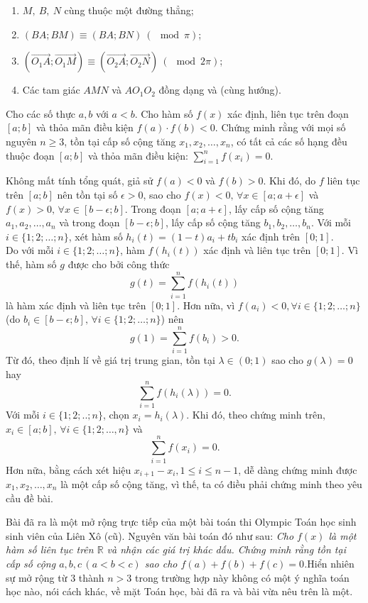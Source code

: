 \begin{bt}
{\begin{nx}
\begin{enumerate}[1.]
\begin{bode}
					\begin{enumerate}[1.]
						\item $M,~B,~N$ cùng thuộc một đường thẳng;
						\item $(BA;BM)\equiv(BA;BN)~(\mod \pi)$;
						\item $(\vec{O_1A};\vec{O_1M})\equiv(\vec{O_2A};\vec{O_2N}) ~(\mod 2 \pi)$;
						\item Các tam giác $AMN$ và $AO_1O_2$ đồng dạng và (cùng hướng).
					\end{enumerate}
				\end{bode}
			\end{enumerate}
		\end{nx}
	}
\end{bt}
\begin{bt}%
	Cho các số thực $a,b$ với $a<b$. Cho hàm số $f(x)$ xác định, liên tục trên đoạn $[a;b]$ và thỏa mãn điều kiện $f(a)\cdot f(b)<0$. Chứng minh rằng với mọi số nguyên $n\geq 3$, tồn tại cấp số cộng tăng $x_1, x_2, \dotsc, x_n$, có tất cả các số hạng đều thuộc đoạn $[a;b]$ và thỏa mãn điều kiện: $\sum \limits_{i=1}^{n}f(x_i)=0$.
	\loigiai
	{
		Không mất tính tổng quát, giả sử $f(a)<0$ và $f(b)>0$. Khi đó, do $f$ liên tục trên $[a;b]$ nên tồn tại số $\epsilon >0$, sao cho $f(x)<0, \, \forall x\in [a; a+\epsilon]$ và $f(x)>0, \, \forall x\in[b-\epsilon; b]$.		
		Trong đoạn $[a; a+\epsilon]$, lấy cấp số cộng tăng $a_1, a_2, \dotsc, a_n$ và trong đoạn $[b-\epsilon;b]$, lấy cấp số cộng tăng $b_1, b_2,\dotsc,b_n.$ Với mỗi $i\in \{1;2;\dotsc;n\}$, xét hàm số $h_i(t)=(1-t)a_i+tb_i$ xác định trên $[0;1].$\\
		Do với mỗi $i\in \{ 1;2;\dotsc;n\}$, hàm $f(h_i(t))$ xác định và liên tục trên $[0;1]$. Vì thế, hàm số $g$ được cho bởi công thức $$ g(t)=\sum \limits_{i=1}^{n}f(h_i(t))$$ là hàm xác định và liên tục trên $[0;1]$. 		
		Hơn nữa, vì $f(a_i)<0, \forall i\in \{1;2;\dotsc;n\}$ (do $b_i\in [b-\epsilon; b], \,\forall i\in \{1;2;\dotsc;n\}$) nên $$g(1)=\sum\limits_{i=1}^{n}f(b_i)>0.$$
		Từ đó, theo định lí về giá trị trung gian, tồn tại $\lambda \in (0;1)$ sao cho $g(\lambda)=0$ hay $$\sum\limits_{i=1}^{n} f(h_i(\lambda))=0.$$
		Với mỗi $i\in\{1;2;..;n\}$, chọn $x_i=h_i(\lambda)$. Khi đó, theo chứng minh trên, $x_i\in[a;b], \, \forall i\in \{ 1;2;\dotsc,n\}$ và $$\sum\limits_{i=1}^{n} f(x_i)=0.$$
		Hơn nữa, bằng cách xét hiệu $x_{i+1}-x_i, 1\leq i\leq n-1$, dễ dàng chứng minh được $x_1, x_2,\dotsc, x_n$ là một cấp số cộng tăng, vì thế, ta có điều phải chứng minh theo yêu cầu đề bài.
\begin{nx}Bài đã ra là một mở rộng trực tiếp của một bài toán thi Olympic Toán học sinh sinh viên của Liên Xô (cũ). Nguyên văn bài toán đó như sau: {\em{Cho $f(x)$ là một hàm số liên tục trên $\mathbb{R}$ và nhận các giá trị khác dấu. Chứng minh rằng tồn tại cấp số cộng $a,b,c\, (a<b<c)$ sao cho $f(a)+f(b)+f(c)=0$.}}Hiển nhiên sự mở rộng từ $3$ thành $n>3$ trong trường hợp này không có một ý nghĩa toán học nào, nói cách khác, về mặt Toán học, bài đã ra và bài vừa nêu trên là một.
			

\end{nx}}
\end{bt}

